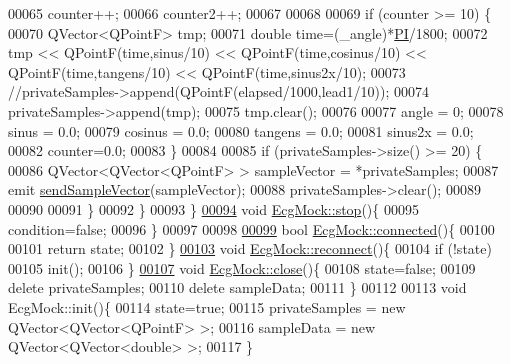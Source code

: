 \begin{DoxyCode}
00065         counter++;
00066         counter2++;
00067 
00068 
00069         \textcolor{keywordflow}{if} (counter >= 10) \{
00070             QVector<QPointF> tmp;
00071             \textcolor{keywordtype}{double} time=(\_angle)*\hyperlink{ecgmock_8h_a598a3330b3c21701223ee0ca14316eca}{PI}/1800;
00072             tmp << QPointF(time,sinus/10) << QPointF(time,cosinus/10) << QPointF(time,tangens/10) << 
      QPointF(time,sinus2x/10);
00073             \textcolor{comment}{//privateSamples->append(QPointF(elapsed/1000,lead1/10));}
00074             privateSamples->append(tmp);
00075             tmp.clear();
00076 
00077             angle = 0;
00078             sinus = 0.0;
00079             cosinus = 0.0;
00080             tangens = 0.0;
00081             sinus2x = 0.0;
00082             counter=0.0;
00083         \}
00084 
00085         \textcolor{keywordflow}{if} (privateSamples->size() >= 20) \{
00086             QVector<QVector<QPointF> > sampleVector = *privateSamples;
00087             emit \hyperlink{classDeviceInterface_ae1bcd766865161a659076d2561e79dc5}{sendSampleVector}(sampleVector);
00088             privateSamples->clear();
00089 
00090 
00091         \}
00092     \}
00093 \}
\hypertarget{ecgmock_8cpp_source.tex_l00094}{}\hyperlink{classEcgMock_aa65eb7c062913402c77ed1dc628168a7}{00094} \textcolor{keywordtype}{void} \hyperlink{classEcgMock_aa65eb7c062913402c77ed1dc628168a7}{EcgMock::stop}()\{
00095     condition=\textcolor{keyword}{false};
00096 \}
00097 
00098 
\hypertarget{ecgmock_8cpp_source.tex_l00099}{}\hyperlink{classEcgMock_ab5e3aac9d92b52b23fafb6e540902f28}{00099} \textcolor{keywordtype}{bool} \hyperlink{classEcgMock_ab5e3aac9d92b52b23fafb6e540902f28}{EcgMock::connected}()\{
00100 
00101     \textcolor{keywordflow}{return} state;
00102 \}
\hypertarget{ecgmock_8cpp_source.tex_l00103}{}\hyperlink{classEcgMock_aed480e6edc6016917a5663f61b3a5091}{00103} \textcolor{keywordtype}{void}  \hyperlink{classEcgMock_aed480e6edc6016917a5663f61b3a5091}{EcgMock::reconnect}()\{
00104     \textcolor{keywordflow}{if} (!state)
00105         init();
00106 \}
\hypertarget{ecgmock_8cpp_source.tex_l00107}{}\hyperlink{classEcgMock_a34af13005b5ea44386b7b875b72e9fc3}{00107} \textcolor{keywordtype}{void}  \hyperlink{classEcgMock_a34af13005b5ea44386b7b875b72e9fc3}{EcgMock::close}()\{
00108     state=\textcolor{keyword}{false};
00109     \textcolor{keyword}{delete} privateSamples;
00110     \textcolor{keyword}{delete} sampleData;
00111 \}
00112 
00113 \textcolor{keywordtype}{void} EcgMock::init()\{
00114     state=\textcolor{keyword}{true};
00115     privateSamples = \textcolor{keyword}{new} QVector<QVector<QPointF> >;
00116     sampleData = \textcolor{keyword}{new} QVector<QVector<double> >;
00117 \}
\end{DoxyCode}
